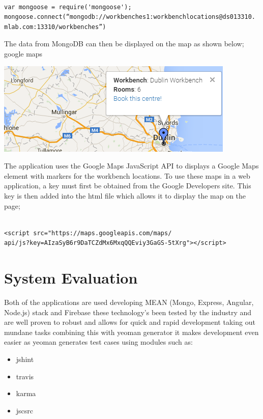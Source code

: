 \begin{itemize}
\begin{verbatim}

var mongoose = require('mongoose');
mongoose.connect(“mongodb://workbenches1:workbenchlocations@ds013310.
mlab.com:13310/workbenches”)

\end{verbatim}

The data from MongoDB can then be displayed on the map as shown below;
google maps

\begin{center}    
	\includegraphics{img/googlempas.png}
\end{center}

The application uses the Google Maps JavaScript API to displays a Google Maps element with markers for the workbench locations. To use these maps in a web application, a key must first be obtained from the Google Developers site. This key is then added into the html file which allows it to display the map on the page;

\begin{verbatim}

<script src="https://maps.googleapis.com/maps/
api/js?key=AIzaSyB6r9DaTCZdMx6MxqQQEviy3GaGS-5tXrg"></script>

\end{verbatim}



\chapter{System Evaluation}

Both of the applications are used developing MEAN (Mongo, Express, Angular, Node.js) stack and Firebase these technology’s been tested by the industry and are well proven to robust and allows for quick and rapid development taking out mundane tasks combining this with yeoman generator it makes development even easier as yeoman generates test cases using modules such as:

\begin{itemize}
	\item jshint
	\item travis
	\item karma 
	\item jscsrc 
\end{itemize}


\end{itemize}
